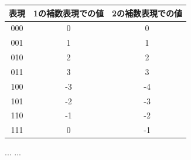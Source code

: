 \documentclass[a4j,10pt,oneside,openany,fleqn]{jsbook}
\begin{document}
\begin{table}[htb]
  \begin{center}
    \begin{tabular}{c|cc} 
      表現 & 1の補数表現での値 & 2の補数表現での値 \\ \hline 
      000  & 0 & 0 \\ 
      001  & 1 & 1 \\ 
      010  & 2 & 2 \\ 
      011  & 3 & 3 \\ 
      100  & -3 & -4 \\ 
      101  & -2 & -3 \\ 
      110  & -1 & -2 \\ 
      111  & 0 & -1 \\ 
    \end{tabular}
  \end{center}
\end{table}


\begin{thebibliography}{20}
...
  ...
\end{thebibliography}

\newpage
\printindex
%
%
\end{document}

